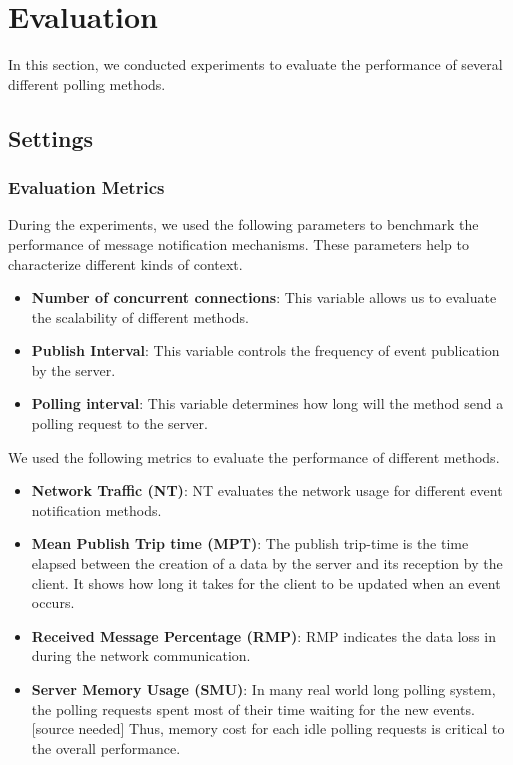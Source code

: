 \section {Evaluation\\}

In this section, we conducted experiments to evaluate the performance of several different polling methods.

\subsection{Settings \\}

\subsubsection{Evaluation Metrics \\}
During the experiments, we used the following parameters to benchmark 
the performance of message notification mechanisms. These parameters help 
to characterize different kinds of context.

\begin{itemize}
    \item {\bf Number of concurrent connections}: This variable allows us 
         to evaluate the scalability of different methods.
    \item {\bf Publish Interval}: This variable controls the frequency of 
         event publication by the server. 
    \item {\bf Polling interval}: This variable determines how long will 
        the method send a polling request to the server.
\end{itemize}

We used the following metrics to evaluate the performance of different
methods.
\begin{itemize}
    \item {\bf Network Traffic (NT)}: NT evaluates the network usage for
        different event notification methods.
    \item {\bf Mean Publish Trip time (MPT)}: The publish trip-time is 
        the time elapsed between the creation of a data by the server and 
        its reception by the client. It shows how long it takes for the 
        client to be updated when an event occurs.
    \item {\bf Received Message Percentage (RMP)}: RMP indicates the data 
        loss in during the network communication. 
    \item {\bf Server Memory Usage (SMU)}: In many real world long polling 
        system, the polling requests spent most of their time waiting for 
        the new events.[source needed] Thus, memory cost for each idle 
        polling requests is critical to the overall performance.
\end{itemize}

